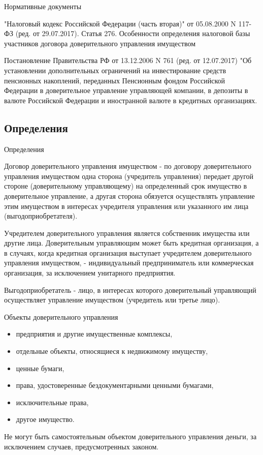 \documentclass[_Banking_p3.tex]{subfiles}
\begin{document}
\begin{frame}[allowframebreaks]{Нормативные документы}
\begin{thebibliography}{10}
\pagebreak

"Налоговый кодекс Российской Федерации (часть вторая)" от 05.08.2000 N 117-ФЗ (ред. от 29.07.2017). Статья 276. Особенности определения налоговой базы участников договора доверительного управления имуществом

\pagebreak

Постановление Правительства РФ от 13.12.2006 N 761 (ред. от 12.07.2017) "Об установлении дополнительных ограничений на инвестирование средств пенсионных накоплений, переданных Пенсионным фондом Российской Федерации в доверительное управление управляющей компании, в депозиты в валюте Российской Федерации и иностранной валюте в кредитных организациях. 

  \end{thebibliography}
\end{frame}

\subsection{Определения}
\begin{frame} [ allowframebreaks]{Определения}
\begin{block}{Договор доверительного управления имуществом}
\quad
- по договору доверительного управления имуществом одна сторона (учредитель управления) передает другой стороне (доверительному управляющему) на определенный срок имущество в доверительное управление, а другая сторона обязуется осуществлять управление этим имуществом в интересах учредителя управления или указанного им лица (выгодоприобретателя).
\end{block}
Учредителем доверительного управления является собственник имущества или другие лица.
\pagebreak
Доверительным управляющим может быть кредитная организация, а в случаях, когда кредитная организация выступает учредителем доверительного управления имуществом, - индивидуальный предприниматель или коммерческая организация, за исключением унитарного предприятия.

Выгодоприобретатель - лицо, в интересах которого доверительный управляющий осуществляет управление имуществом (учредитель или третье лицо).

\end{frame}
\begin{frame}{Объекты доверительного управления }
\begin{itemize}
\item
предприятия и другие имущественные комплексы, 
\item
отдельные объекты, относящиеся к недвижимому имуществу, 
\item
ценные бумаги, 
\item
права, удостоверенные бездокументарными ценными бумагами, 
\item
исключительные права,
\item
другое имущество. 
\end{itemize}
Не могут быть самостоятельным объектом доверительного управления деньги, за исключением случаев, предусмотренных законом.
\end{frame}
\end{document}
